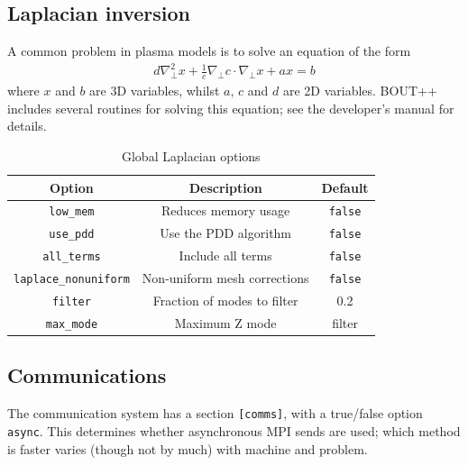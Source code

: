 \documentclass[12pt]{article}
\newcommand{\code}[1]{\texttt{#1}}
\begin{document}
\subsection{Laplacian inversion}
%
%
A common problem in plasma models is to solve an equation of the form
%
\begin{align}
d\nabla^2_\perp x + \frac{1}{c}\nabla_\perp c\cdot\nabla_\perp x + a x = b
\end{align}
%
where $x$ and $b$ are 3D variables, whilst $a$, $c$ and $d$ are 2D variables.
BOUT++ includes several routines for solving this equation; see the developer's
manual for details.

%
\begin{table}[htbp!]
\caption{Global Laplacian options}
%
\label{tab:lapopts}
%
\centering
%
\begin{tabular}[c]{c c c}
\hline
Option & Description & Default \\
\hline
\texttt{low\_mem} & Reduces memory usage & \texttt{false} \\
\texttt{use\_pdd} & Use the PDD algorithm & \texttt{false} \\
\texttt{all\_terms} & Include all terms & \texttt{false} \\
\texttt{laplace\_nonuniform} & Non-uniform mesh corrections & \texttt{false} \\
\texttt{filter} & Fraction of modes to filter & 0.2 \\
\texttt{max\_mode} & Maximum Z mode & filter \\
\hline
\end{tabular}
%
\end{table}
%



\subsection{Communications}
%
%
The communication system has a section \code{[comms]}, with a true/false option
\code{async}. This determines whether asynchronous MPI sends are used; which
method is faster varies (though not by much) with machine and problem.
\end{document}
